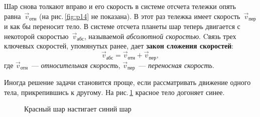 \documentclass[main.tex]{subfiles}
\begin{document}
Шар снова толкают вправо и его скорость в системе отсчета тележки опять равна~$\vec v_\text{отн}$ (на рис.\,\ref{fig:p14} не показана). В этот раз тележка имеет скорость~$\vec v_\text{пер}$ и как бы переносит тело. В системе отсчета планеты шар теперь двигается с некоторой скоростью~$\vec v_\text{абс}$, называемой \emph{абсолютной скоростью}. Cвязь трех ключевых скоростей, упомянутых ранее, дает \textbf{закон сложения скоростей}:
\begin{equation}
    \vec v_\text{абс}=\vec v_\text{отн}+\vec v_\text{пер},
\end{equation}
где $\vec v_\text{отн}$~--- \emph{относительная скорость}, $\vec v_\text{пер}$~--- \emph{переносная скорость}.





Иногда решение задачи становится проще, если рассматривать движение одного тела, прикрепившись к другому. На рис.\,\ref{fig:p15} красное тело догоняет синее.

    \begin{figure}[H]
    \centering

\caption{Красный шар настигает синий шар}
\label{fig:p15}
\end{figure}
\end{document}
